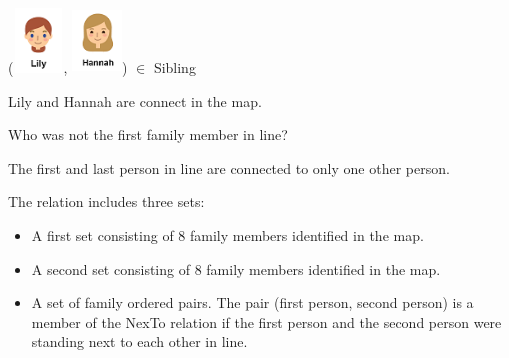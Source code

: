 \documentclass{ximera}
\begin{document}
\begin{exercise}
 ({\includegraphics[width=50px,height=65px]{pics/people/lily.png}}, {\includegraphics[width=50px,height=65px]{pics/people/hannah.png}}) $\in$ Sibling 

  \begin{multipleChoice}
  \end{multipleChoice}
  \begin{feedback}
Lily and Hannah are connect in the map.
  \end{feedback}
\end{exercise}












\begin{exercise}
Who was not the first family member in line?

  \begin{selectAll}
  \end{selectAll}
  \begin{feedback}
The first and last person in line are connected to only one other person.
  \end{feedback}
\end{exercise}





  \begin{definition}
  The  relation includes three sets:
    \begin{itemize}
    \item A first set consisting of 8 family members identified in the map.
    \item A second set consisting of 8 family members identified in the map.
    \item A set of family ordered pairs. The pair (first person, second person) is a member of the NexTo relation if the first person and the second person were standing next to each other in line.
    \end{itemize}
  \end{definition}
\end{document}
